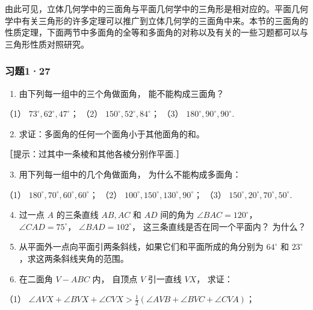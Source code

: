 由此可见，立体几何学中的三面角与平面几何学中的三角形是相对应的。平面几何学中有关三角形的许多定理可以推广到立体几何学的三面角中来。本节的三面角的性质定理，下面两节中多面角的全等和多面角的对称以及有关的一些习题都可以与三角形性质对照研究。

\subsubsection{习题1·27}

\begin{enumerate}
\item
  由下列每一组中的三个角做面角， 能不能构成三面角？
\end{enumerate}

（1） \(73^{\circ}, 62^{\circ}, 47^{\circ}\)； （2）
\(150^{\circ}, 52^{\circ}, 84^{\circ}\)； （3）
\(180^{\circ}, 90^{\circ}, 90^{\circ}\).

\begin{enumerate}
\setcounter{enumi}{1}
\item
  求证：多面角的任何一个面角小于其他面角的和。
\end{enumerate}

［提示：过其中一条棱和其他各棱分别作平面.］

\begin{enumerate}
\setcounter{enumi}{2}
\item
  用下列每一组中的几个角做面角， 为什么不能构成多面角：
\end{enumerate}

（1） \(180^{\circ}, 70^{\circ}, 60^{\circ}, 60^{\circ}\)； （2）
\(100^{\circ}, 150^{\circ}, 130^{\circ}, 90^{\circ}\)； （3）
\(150^{\circ}, 20^{\circ}, 70^{\circ}, 50^{\circ}\).

\begin{enumerate}
\setcounter{enumi}{3}
\item
  过一点 \(A\) 的三条直线 \(AB, AC\) 和 \(AD\) 间的角为
  \(\angle BAC = 120^\circ\)， \(\angle CAD = 75^\circ\)，
  \(\angle BAD = 102^\circ\)， 这三条直线是否在同一个平面内？ 为什么？
\item
  从平面外一点向平面引两条斜线，如果它们和平面所成的角分别为
  \(64^{\circ}\) 和 \(23^{\circ}\)，求这两条斜线夹角的范围。
\item
  在二面角 \(V - ABC\) 内， 自顶点 \(V\) 引一直线 \(VX\)， 求证：
\end{enumerate}

（1）
\(\angle AVX + \angle BVX + \angle CVX > \frac{1}{2} (\angle AVB + \angle BVC + \angle CVA)\)；

